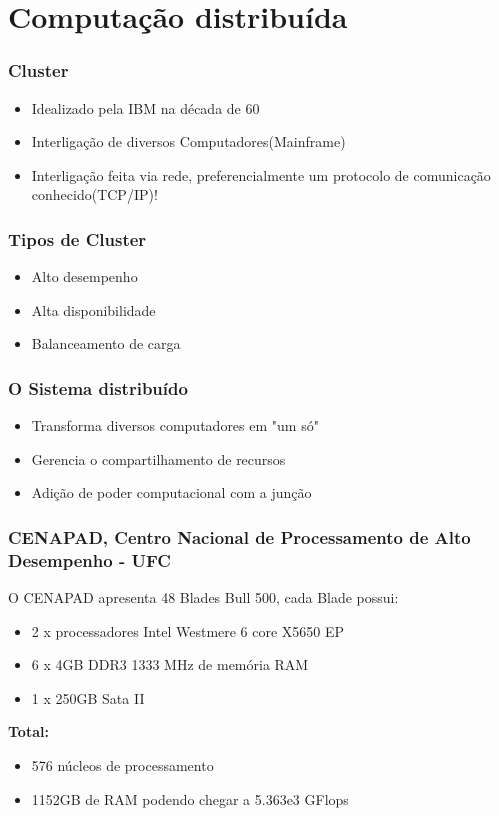 \documentclass{beamer}
\begin{document}
\section{Computação distribuída}

\begin{frame}
    \frametitle{Cluster}

\begin{itemize}
    \item Idealizado pela IBM na década de 60
    \item Interligação de diversos Computadores(Mainframe)
    \item Interligação feita via rede, preferencialmente um protocolo de comunicação conhecido(TCP/IP)!
\end{itemize}
\end{frame}

\begin{frame}
    \frametitle{Tipos de Cluster}

\begin{itemize}
    \item Alto desempenho
    \item Alta disponibilidade
    \item Balanceamento de carga
\end{itemize}

\end{frame}

\begin{frame}
    \frametitle{O Sistema distribuído}

\begin{itemize}
    \item Transforma diversos computadores em "um só"
    \item Gerencia o compartilhamento de recursos
    \item Adição de poder computacional com a junção
\end{itemize}
\end{frame}

\begin{frame}
    \frametitle{CENAPAD, Centro Nacional de Processamento de Alto Desempenho - UFC}
    
    O CENAPAD apresenta 48 Blades Bull 500, cada Blade possui:
    \begin{itemize}
        \item 2 x processadores Intel Westmere 6 core X5650 EP
        \item 6 x 4GB DDR3 1333 MHz de memória RAM
        \item 1 x 250GB Sata II
    \end{itemize}

    \textbf{Total:}
    \begin{itemize}
        \item 576 núcleos de processamento
        \item 1152GB de RAM podendo chegar a 5.363e3 GFlops
    \end{itemize}
\end{frame}
\end{document}
